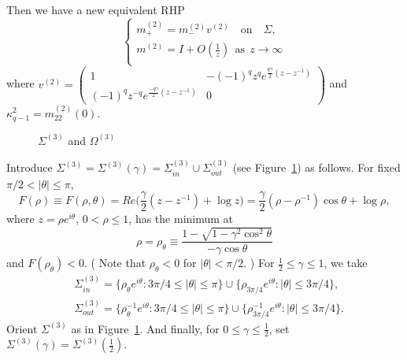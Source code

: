 \documentclass{amsart}
\theoremstyle{definition}
\theoremstyle{remark}
\numberwithin{equation}{section}
\begin{document}
Then we have a new equivalent RHP
\begin{equation}
\begin{cases}
m^{(2)}_+=m^{(2)}_- v^{(2)}\quad\text{on} \quad\Sigma,\\
m^{(2)}=I+O(\frac1z) \ \ \text{as}\ \ z\rightarrow \infty\\
\end{cases}
\end{equation}
where $v^{(2)}= \begin{pmatrix} 
1& -(-1)^qz^qe^{\frac{q\gamma}{2}(z-z^{-1})} \\
(-1)^qz^{-q}e^{\frac{-q\gamma}{2}(z-z^{-1})}&0 \end{pmatrix}$ 
and $\kappa^2_{q-1}=m_{22}^{(2)}(0)$. \\

\begin{figure}[ht]
 \centerline{}
 \caption{$\Sigma^{(3)}$ and $\Omega^{(3)}$}\label{fig-ga<1}
\end{figure}
Introduce $\Sigma^{(3)}=\Sigma^{(3)}(\gamma)=\Sigma^{(3)}_{in}\cup\Sigma^
{(3)}_{out}$ (see Figure~\ref{fig-ga<1}) as follows.
For fixed $\pi/2 <|\theta|\le\pi$, 
\begin{equation}\label{e-z8}
  F(\rho)\equiv F(\rho,\theta)=
  Re\bigl( \frac{\gamma}2(z-z^{-1})+\log{z} \bigr)
  =\frac{\gamma}2 (\rho-\rho^{-1})\cos{\theta}+\log{\rho}, 
\end{equation}
where $z=\rho e^{i\theta}$, $0<\rho\le 1$, has the minimum at  
\begin{equation}\label{e-z9}
  \rho=\rho_{\theta}\equiv \frac{1-\sqrt{1-\gamma^2\cos^2 \theta}}
  {-\gamma\cos{\theta}}
\end{equation}
and 
$F(\rho_{\theta})<0$. 
( Note that $\rho_{\theta}<0$ for $|\theta|<\pi/2$. )
For $\frac12\le\gamma\le1$, we take 
\begin{equation}\label{e-Sig}
  \begin{split}
   &\Sigma^{(3)}_{in}=\{\rho_{\theta}e^{i\theta} : 
3\pi/4 \le |\theta|\le\pi \} \cup\{\rho_{3\pi/4}e^{i\theta} : 
|\theta|\le 3\pi/4 \},\\
   &\Sigma^{(3)}_{out}=\{\rho_{\theta}^{-1}e^{i\theta} :
3\pi/4 \le |\theta|\le\pi \} \cup\{\rho_{3\pi/4}^{-1}e^{i\theta} : 
|\theta|\le 3\pi/4 \}.
  \end{split}
\end{equation}
Orient $\Sigma^{(3)}$ as in Figure~\ref{fig-ga<1}. 
And finally, for $0\le\gamma\le\frac12$, set 
$\Sigma^{(3)}(\gamma)=\Sigma^{(3)}(\frac12)$.
\end{document}
